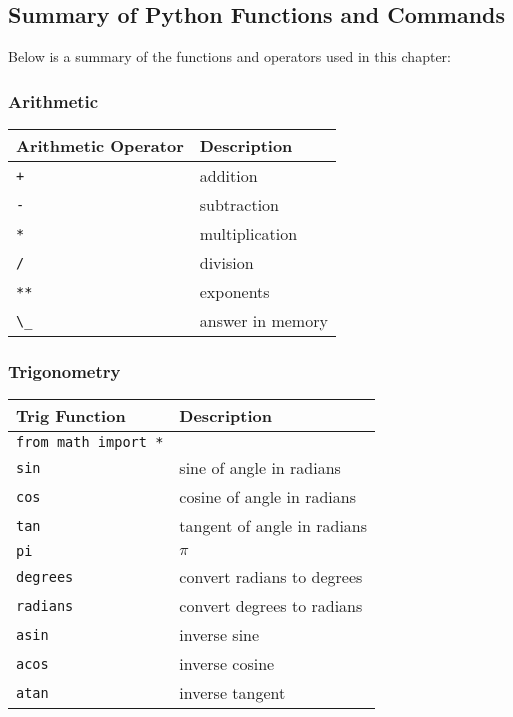 \documentclass{book}
\newcommand{\passthrough}[1]{#1}
\begin{document}
    




    
        \hypertarget{summary-of-python-functions-and-commands}{%
\subsection{Summary of Python Functions and
Commands}\label{summary-of-python-functions-and-commands}}

Below is a summary of the functions and operators used in this chapter:

\hypertarget{arithmetic}{%
\subsubsection{Arithmetic}\label{arithmetic}}

\begin{longtable}[]{@{}ll@{}}
\toprule
Arithmetic Operator & Description\tabularnewline
\midrule
\endhead
\passthrough{\lstinline!+!} & addition\tabularnewline
\passthrough{\lstinline!-!} & subtraction\tabularnewline
\passthrough{\lstinline!*!} & multiplication\tabularnewline
\passthrough{\lstinline!/!} & division\tabularnewline
\passthrough{\lstinline!**!} & exponents\tabularnewline
\passthrough{\lstinline!\_!} & answer in memory\tabularnewline
\bottomrule
\end{longtable}

\hypertarget{trigonometry}{%
\subsubsection{Trigonometry}\label{trigonometry}}

\begin{longtable}[]{@{}ll@{}}
\toprule
Trig Function & Description\tabularnewline
\midrule
\endhead
\passthrough{\lstinline!from math import *!} &\tabularnewline
\passthrough{\lstinline!sin!} & sine of angle in radians\tabularnewline
\passthrough{\lstinline!cos!} & cosine of angle in
radians\tabularnewline
\passthrough{\lstinline!tan!} & tangent of angle in
radians\tabularnewline
\passthrough{\lstinline!pi!} & \(\pi\)\tabularnewline
\passthrough{\lstinline!degrees!} & convert radians to
degrees\tabularnewline
\passthrough{\lstinline!radians!} & convert degrees to
radians\tabularnewline
\passthrough{\lstinline!asin!} & inverse sine\tabularnewline
\passthrough{\lstinline!acos!} & inverse cosine\tabularnewline
\passthrough{\lstinline!atan!} & inverse tangent\tabularnewline
\bottomrule
\end{longtable}
\end{document}

